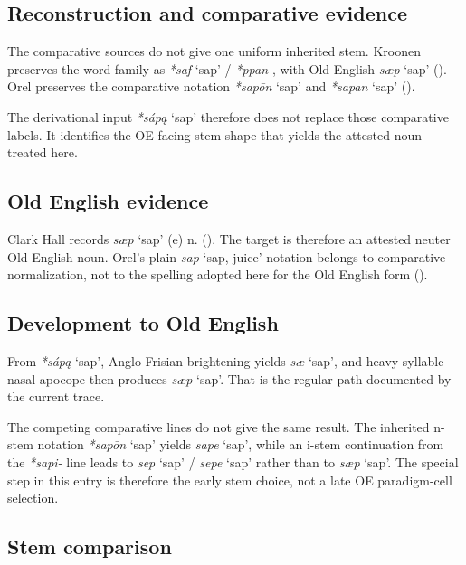 \documentclass[
  british,
  a4paper,
  openany]{book}
\providecommand{\Recon}[1]{\emph{*#1}}
{\catcode`→=\active \global\def→{\ensuremath{\rightarrow}}}
\providecommand{\Recon}[1]{\emph{*#1}}
{\catcode`→=\active \global\def→{\ensuremath{\rightarrow}}}
\begin{document}
\subsection{Reconstruction and comparative
evidence}\label{reconstruction-and-comparative-evidence-93}

The comparative sources do not give one uniform inherited stem. Kroonen
preserves the word family as \Recon{saf} `sap' / \emph{*ppan-}, with Old
English \emph{sæp} `sap' (). Orel preserves the comparative notation \Recon{sapōn} `sap' and
\Recon{sapan} `sap' ().

The derivational input {\Recon{sápą} `sap'} therefore does not replace
those comparative labels. It identifies the OE-facing stem shape that
yields the attested noun treated here.

\subsection{Old English evidence}\label{old-english-evidence-93}

Clark Hall records {\emph{sæp}} `sap' (e) n.
(). The target is
therefore an attested neuter Old English noun. Orel's plain {\emph{sap}}
`sap, juice' notation belongs to comparative normalization, not to the
spelling adopted here for the Old English form
().

\subsection{Development to Old
English}\label{development-to-old-english-93}

From {\Recon{sápą} `sap'}, Anglo-Frisian brightening yields \emph{sæ}
`sap', and heavy-syllable nasal apocope then produces {\emph{sæp}}
`sap'. That is the regular path documented by the current trace.

The competing comparative lines do not give the same result. The
inherited n-stem notation {\Recon{sapōn} `sap'} yields {\emph{sape}}
`sap', while an i-stem continuation from the {\emph{*sapi-}} line leads
to {\emph{sep}} `sap' / {\emph{sepe}} `sap' rather than to {\emph{sæp}}
`sap'. The special step in this entry is therefore the early stem
choice, not a late OE paradigm-cell selection.

\subsection{Stem comparison}\label{stem-comparison-5}
\end{document}
